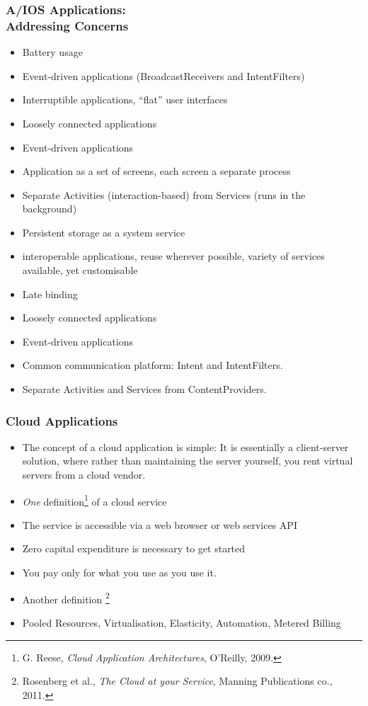\documentclass[10pt]{beamer}
\def\subitem{\item[\hspace{1.5cm} -]}
\begin{document}
\begin{frame}[t]
\frametitle{A/IOS Applications:\\Addressing Concerns}
\begin{itemize}
\item Battery usage
\subitem Event-driven applications (BroadcastReceivers and IntentFilters)
\item Interruptible applications, ``flat'' user interfaces
\subitem Loosely connected applications %
\subitem Event-driven applications
\subitem Application as a set of screens, each screen a separate process
\subitem Separate Activities (interaction-based) from Services (runs in the background)
\subitem Persistent storage as a system service
\item interoperable applications, reuse wherever possible, variety of services available, yet customisable
\subitem Late binding
\subitem Loosely connected applications
\subitem Event-driven applications
\subitem Common communication platform: Intent and IntentFilters.
\subitem Separate Activities and Services from ContentProviders.
\end{itemize}
\end{frame}


\begin{frame}[t]
\frametitle{Cloud Applications}
\begin{itemize}
\item The concept of a cloud application is simple: It is essentially a client-server solution, where rather than maintaining the server yourself, you rent virtual servers from a cloud vendor.
\item \emph{One} definition\footnote{G. Reese, \emph{Cloud Application Architectures}, O'Reilly, 2009.} of a cloud service
\subitem The service is accessible via a web browser or web services API
\subitem Zero capital expenditure is necessary to get started
\subitem You pay only for what you use as you use it.
\item Another definition \footnote{Rosenberg et al., \emph{The Cloud at your Service}, Manning Publications co., 2011. }
\subitem Pooled Resources, Virtualisation, Elasticity, Automation, Metered Billing
\end{itemize}
\end{frame}
\end{document}
